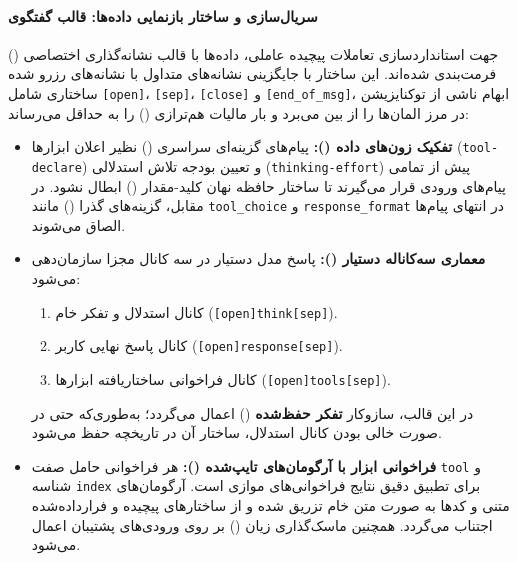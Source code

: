 \paragraph*{سریال‌سازی و ساختار بازنمایی داده‌ها: قالب گفتگوی }
جهت استانداردسازی تعاملات پیچیده عاملی، داده‌ها با قالب نشانه‌گذاری اختصاصی  () فرمت‌بندی شده‌اند. این ساختار با جایگزینی نشانه‌های متداول  با نشانه‌های رزرو شده ساختاری شامل \texttt{[open]}، \texttt{[sep]}، \texttt{[close]} و \texttt{[end\_of\_msg]}، ابهام ناشی از توکنایزیشن در مرز المان‌ها را از بین می‌برد و بار مالیات هم‌ترازی () را به حداقل می‌رساند:
\begin{itemize}
    \item \textbf{تفکیک زون‌های داده ():} پیام‌های گزینه‌ای سراسری () نظیر اعلان ابزارها (\texttt{tool-declare}) و تعیین بودجه تلاش استدلالی (\texttt{thinking-effort}) پیش از تمامی پیام‌های ورودی قرار می‌گیرند تا ساختار حافظه نهان کلید-مقدار () ابطال نشود. در مقابل، گزینه‌های گذرا () مانند \texttt{tool\_choice} و \texttt{response\_format} در انتهای پیام‌ها الصاق می‌شوند.
    \item \textbf{معماری سه‌کاناله دستیار ():} پاسخ مدل دستیار در سه کانال مجزا سازمان‌دهی می‌شود:
    \begin{enumerate}
        \item کانال استدلال و تفکر خام (\texttt{[open]think[sep]}).
        \item کانال پاسخ نهایی کاربر (\texttt{[open]response[sep]}).
        \item کانال فراخوانی ساختاریافته ابزارها (\texttt{[open]tools[sep]}).
    \end{enumerate}
    در این قالب، سازوکار \textbf{تفکر حفظ‌شده} () اعمال می‌گردد؛ به‌طوری‌که حتی در صورت خالی بودن کانال استدلال، ساختار آن در تاریخچه حفظ می‌شود.
    \item \textbf{فراخوانی ابزار با آرگومان‌های تایپ‌شده ():} هر فراخوانی حامل صفت \texttt{tool} و شناسه \texttt{index} برای تطبیق دقیق نتایج فراخوانی‌های موازی است. آرگومان‌های متنی و کدها به صورت متن خام تزریق شده و از ساختارهای پیچیده و فرارداده‌شده  اجتناب می‌گردد. همچنین ماسک‌گذاری زیان () بر روی ورودی‌های پشتیبان  اعمال می‌شود.
\end{itemize}

